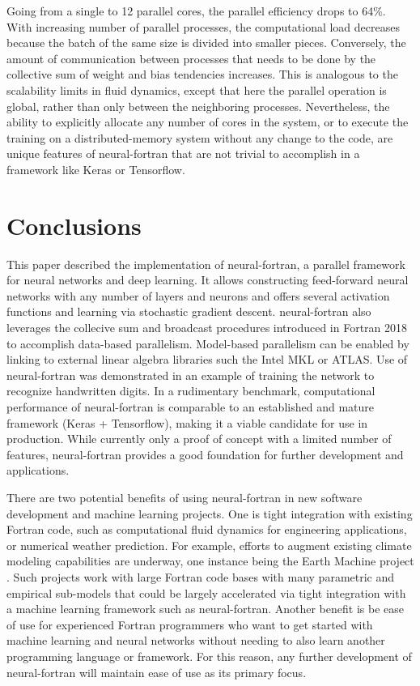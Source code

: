 \documentclass[sigplan, review=false, screen=true, balance=true]{acmart}
\begin{document}
Going from a single to 12 parallel cores, the parallel efficiency drops
to 64\%. With increasing number of parallel processes, the computational
load decreases because the batch of the same size is divided into smaller pieces.
Conversely, the amount of communication between processes that needs to be
done by the collective sum of weight and bias tendencies increases. This is
analogous to the scalability limits in fluid dynamics, except that here the
parallel operation is global, rather than only between the neighboring
processes. Nevertheless, the ability to explicitly allocate any number
of cores in the system, or to execute the training on a distributed-memory
system without any change to the code, are unique features of neural-fortran
that are not trivial to accomplish in a framework like Keras or Tensorflow.

\section{Conclusions} \label{section_conclusions}

This paper described the implementation of neural-fortran, a parallel framework
for neural networks and deep learning. It allows constructing feed-forward
neural networks with any number of layers and neurons and offers several
activation functions and learning via stochastic gradient descent.
neural-fortran also leverages the collecive sum and broadcast procedures
introduced in Fortran 2018 to accomplish data-based parallelism.
Model-based parallelism can be enabled by linking to external linear algebra
libraries such the Intel MKL or ATLAS. Use of neural-fortran was demonstrated
in an example of training the network to recognize handwritten digits.
In a rudimentary benchmark, computational performance of neural-fortran is
comparable to an established and mature framework (Keras + Tensorflow),
making it a viable candidate for use in production.
While currently only a proof of concept with a limited number of features,
neural-fortran provides a good foundation for further development and
applications.

There are two potential benefits of using neural-fortran in new
software development and machine learning projects.
One is tight integration with existing Fortran code, such as computational
fluid dynamics for engineering applications, or numerical weather prediction.
For example, efforts to augment existing climate modeling capabilities are underway,
one instance being the Earth Machine project \citep{schneider17, voosen18}.
Such projects work with large Fortran code bases with many parametric and
empirical sub-models that could be largely accelerated via tight integration
with a machine learning framework such as neural-fortran.
Another benefit is be ease of use for experienced Fortran programmers who
want to get started with machine learning and neural networks without needing
to also learn another programming language or framework. For this reason, any
further development of neural-fortran will maintain ease of use as its primary
focus.
\end{document}
